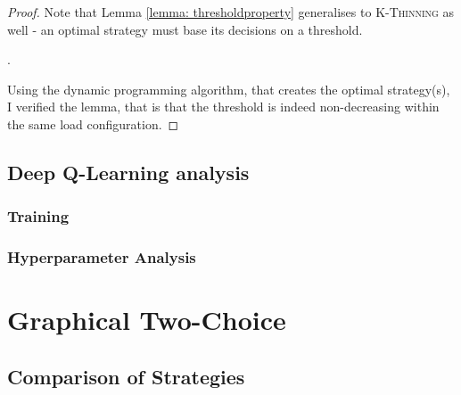 \begin{proof}
Note that Lemma \ref{lemma: thresholdproperty} generalises to \textsc{K-Thinning} as well - an optimal strategy must base its decisions on a threshold.


.


Using the dynamic programming algorithm, that creates the optimal strategy(s), I verified the lemma, that is that the threshold is indeed non-decreasing within the same load configuration.
\end{proof}


\subsection{Deep Q-Learning analysis}


\subsubsection{Training}


\subsubsection{Hyperparameter Analysis}




\section{Graphical Two-Choice}


\subsection{Comparison of Strategies}


